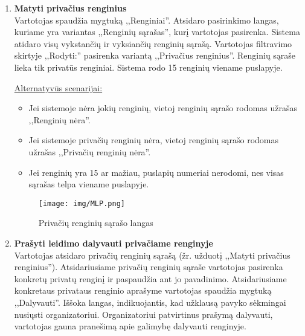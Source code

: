 \documentclass{VUMIFPSkursinis}
\begin{document}
\begin{enumerate} [label = \textbf{U\arabic*.}]
					\underline{Alternatyvūs scenarijai:}
					\begin{itemize}
						\item Jeigu detalesnės informacijos apie organizatorių nėra, sistemoje pateikiamas užrašas ,,Šios inforamacijos nėra''.
						\item Jeigu sistemoje nėra renginių, vartotojui pateikiama žinutė:
						,,Atsiprašome, jums prieinamų renginių nėra. Norėdami pamatyti daugiau pasirinkimų, prisijunkite.''
					\end{itemize}

				\begin{figure}[H]
					\centering
					\texttt{[image: img/MLP.png]}
					\caption{Renginio organizatoriaus informacijos patikrinimo langas}
					\label{fig:patikrinti-renginio-organizatoriaus-informacija}
				\end{figure}
			
			\item \textbf{Matyti privačius renginius} \\
					Vartotojas spaudžia mygtuką ,,Renginiai''.
					Atsidaro pasirinkimo langas, kuriame yra variantas ,,Renginių sąrašas'', kurį vartotojas pasirenka.
					Sistema atidaro visų vykstančių ir vyksiančių renginių sąrašą.
					Vartotojas filtravimo skirtyje ,,Rodyti:'' pasirenka variantą ,,Privačius renginius''.
					Renginių sąraše lieka tik privatūs renginiai.
					Sistema rodo 15 renginių viename puslapyje.
					
					\underline{Alternatyvūs scenarijai:}
					\begin{itemize}
						\item Jei sistemoje nėra jokių renginių, vietoj renginių sąrašo rodomas užrašas ,,Renginių nėra''.
						\item Jei sistemoje privačių renginių nėra, vietoj renginių sąrašo rodomas užrašas ,,Privačių renginių nėra''.
						\item Jei renginių yra 15 ar mažiau, puslapių numeriai nerodomi, nes visas sąrašas telpa viename puslapyje.
					\end{itemize}
				
				\begin{figure}[H]
					\centering
					\texttt{[image: img/MLP.png]}
					\caption{Privačių renginių sąrašo langas}
					\label{fig:matyti-privacius-renginius}
				\end{figure}
			\item \textbf{Prašyti leidimo dalyvauti privačiame renginyje} \\
					Vartotojas atsidaro privačių renginių sąrašą (žr. užduotį ,,Matyti privačius renginius'').
					Atsidariusiame privačių renginių sąraše vartotojas pasirenka konkretų privatų renginį ir paspaudžia ant jo pavadinimo.
					Atsidariusiame konkretaus privataus renginio aprašyme vartotojas spaudžia mygtuką ,,Dalyvauti''.
					Iššoka langas, indikuojantis, kad užklausą pavyko sėkmingai nusiųsti organizatoriui.
					Organizatoriui patvirtinus prašymą dalyvauti, vartotojas gauna pranešimą apie galimybę dalyvauti renginyje.
					

\end{enumerate}
\end{document}
